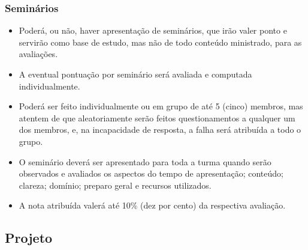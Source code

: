 \begin{frame}[t]\frametitle{Seminários}

  \begin{itemize}
    \justifying{}
    \setlength\itemsep{1em}
    \item Poderá, ou não, haver apresentação de seminários, que irão valer ponto e servirão como base de estudo, mas não de todo conteúdo ministrado, para as avaliações.
    \item A eventual pontuação por seminário será avaliada e computada individualmente.
    \item Poderá ser feito individualmente ou em grupo de até 5 (cinco) membros, mas atentem de que aleatoriamente serão feitos questionamentos a qualquer um dos membros, e, na incapacidade de resposta, a falha será atribuída a todo o grupo.
    \item O seminário deverá ser apresentado para toda a turma quando serão observados e avaliados os aspectos do tempo de apresentação; conteúdo; clareza; domínio; preparo geral e recursos utilizados.
    \item A nota atribuída valerá até 10\% (dez por cento) da respectiva avaliação.
  \end{itemize}

\end{frame}



\subsection[Projeto]{Projeto}\label{subsec:planejamento-projeto}



